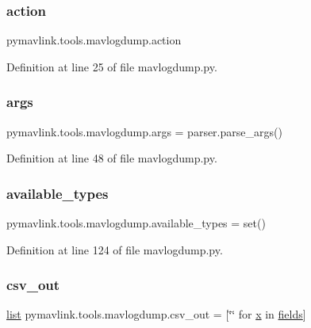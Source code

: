 \subsubsection{\texorpdfstring{action}{action}}
{\footnotesize\ttfamily pymavlink.\+tools.\+mavlogdump.\+action}



Definition at line 25 of file mavlogdump.\+py.

\mbox{\label{namespacepymavlink_1_1tools_1_1mavlogdump_a82cc95658402c05811fc36d24293de5f}} 
\subsubsection{\texorpdfstring{args}{args}}
{\footnotesize\ttfamily pymavlink.\+tools.\+mavlogdump.\+args = parser.\+parse\+\_\+args()}



Definition at line 48 of file mavlogdump.\+py.

\mbox{\label{namespacepymavlink_1_1tools_1_1mavlogdump_a1e9da64218374e9236ed3cd6fbe3046a}} 
\subsubsection{\texorpdfstring{available\_types}{available\_types}}
{\footnotesize\ttfamily pymavlink.\+tools.\+mavlogdump.\+available\+\_\+types = set()}



Definition at line 124 of file mavlogdump.\+py.

\mbox{\label{namespacepymavlink_1_1tools_1_1mavlogdump_afe3b16924e9b873155d166fd727643e3}} 
\subsubsection{\texorpdfstring{csv\_out}{csv\_out}}
{\footnotesize\ttfamily \mbox{\hyperlink{structlist}{list}} pymavlink.\+tools.\+mavlogdump.\+csv\+\_\+out = \mbox{[}\char`\"{}\char`\"{} for \mbox{\hyperlink{plottingTest_8cpp_aa0155849a1850c1edcfe7bce685b08f1}{x}} in \mbox{\hyperlink{namespacepymavlink_1_1tools_1_1mavlogdump_a8a7ca8e476c5e470f5fff33b76b6abb0}{fields}}\mbox{]}}



